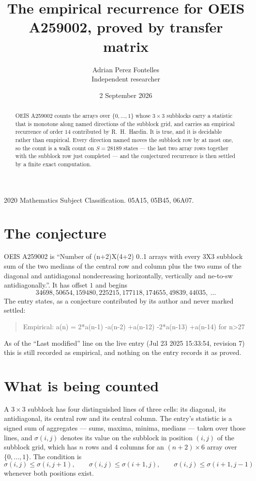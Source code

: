 \documentclass[11pt,a4paper]{article}
\title{The empirical recurrence for OEIS A259002, proved by transfer matrix}
\author{Adrian Perez Fontelles\\ \small Independent researcher}
\date{2 September 2026}
\theoremstyle{plain}
\theoremstyle{definition}
\begin{document}
\maketitle

\begin{abstract}
OEIS A259002 counts the arrays over $\{0,\dots,1\}$ whose $3\times3$ subblocks carry a
statistic that is monotone along named directions of the subblock grid, and carries an
empirical recurrence of order $14$ contributed by R.~H.~Hardin. It is true, and it is
decidable rather than empirical. Every direction named moves the subblock row by at most one,
so the count is a walk count on $S=28189$ states --- the last two array rows together with the
subblock row just completed --- and the conjectured recurrence is then settled by a finite
exact computation.
\end{abstract}

\noindent\small 2020 Mathematics Subject Classification. 05A15, 05B45, 06A07.\normalsize

\section{The conjecture}

OEIS A259002 is ``Number of (n+2)X(4+2) 0..1 arrays with every 3X3 subblock sum of the two medians of the central row and column plus the two sums of the diagonal and antidiagonal nondecreasing horizontally, vertically and ne-to-sw antidiagonally.''. It has offset $1$ and begins
\[
34698, 50654, 159480, 225215, 177118, 174655, 49839, 44035,\ \dots
\]
The entry states, as a conjecture contributed by its author and never marked settled:
\begin{quote}
Empirical: a(n) = 2*a(n-1) -a(n-2) +a(n-12) -2*a(n-13) +a(n-14) for n>27
\end{quote}
As of the ``Last modified'' line on the live entry (Jul 23 2025 15:33:54, revision 7) this is still
recorded as empirical, and nothing on the entry records it as proved.

\section{What is being counted}

A $3\times3$ subblock has four distinguished lines of three cells: its diagonal, its
antidiagonal, its central row and its central column. The entry's statistic is a signed sum of
aggregates --- sums, maxima, minima, medians --- taken over those lines, and $\sigma(i,j)$
denotes its value on the subblock in position $(i,j)$ of the subblock grid, which has $n$ rows
and $4$ columns for an $(n+2)\times6$ array over $\{0,\dots,1\}$. The condition is
\[
\sigma(i,j)\le\sigma(i,j+1),\qquad \sigma(i,j)\le\sigma(i+1,j),\qquad \sigma(i,j)\le\sigma(i+1,j-1)
\]
whenever both positions exist.
\end{document}

